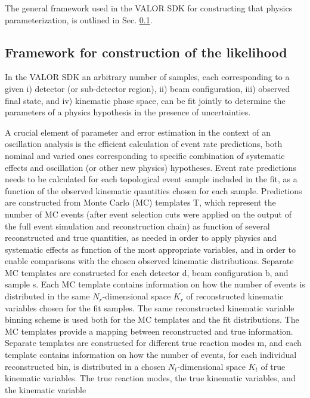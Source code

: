 The general framework used in the VALOR SDK for constructing that physics parameterization, is outlined in Sec. \ref{S:valor_physics_parameterization}.

\subsection{Framework for construction of the likelihood}
\label{S:valor_physics_parameterization}

In the VALOR SDK an arbitrary number of samples, each corresponding
to a given i) detector (or sub-detector region), ii) beam configuration,
iii) observed final state, and iv) kinematic phase space,
can be fit jointly to determine the parameters of a physics hypothesis
in the presence of uncertainties.

A crucial element of parameter and error estimation in the context of
an oscillation analysis
is the efficient calculation of event rate predictions,
both nominal and varied ones corresponding to specific combination of
systematic effects and oscillation (or other new physics) hypotheses.
Event rate predictions needs to be calculated for each topological event
sample included in the fit, as a function of the observed kinematic
quantities chosen for each sample.
Predictions are constructed from Monte Carlo (MC) templates T,
which represent the number of MC events 
(after event selection cuts were applied on the output 
of the full event simulation and reconstruction chain) 
as function of several reconstructed and true quantities,
as needed in order to apply physics and systematic effects
as function of the most appropriate variables, 
and in order to enable comparisons with the chosen
observed kinematic distributions.
Separate MC templates are constructed for each detector d, beam configuration b, 
and sample s. Each MC template contains information on how the number of
events is distributed in the same $N_{r}$-dimensional space {\bf $K_{r}$}  
of reconstructed kinematic variables chosen for the fit samples.
The same reconstructed kinematic variable binning scheme is used
both for the MC templates and the fit distributions.
The MC templates provide a mapping between reconstructed and true information.
Separate templates are constructed for different true reaction modes m, and 
each template contains information on how the number of events, 
for each individual reconstructed bin,
is distributed in a chosen $N_{t}$-dimensional space {\bf $K_{t}$}  
of true kinematic variables.
The true reaction modes, the true kinematic variables, and the kinematic variable
